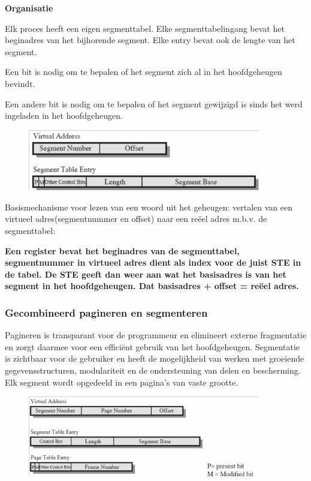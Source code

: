 \textbf{Organisatie}

Elk proces heeft een eigen segmenttabel. Elke segmenttabelingang bevat het beginadres van het bijhorende segment. Elke entry bevat ook de lengte van het segment.

Een bit is nodig om te bepalen of het segment zich al in het hoofdgeheugen bevindt.

Een andere bit is nodig om te bepalen of het segment gewijzigd is sinds het werd ingeladen in het hoofdgeheugen.


\begin{figure}[htp]
    \centering
            \includegraphics[width=4in]{img/organisatie}
        \caption{}
    \label{fig:}
\end{figure}

Basismechanisme voor lezen van een woord uit het geheugen: vertalen van een virtueel adres(segmentnummer en offset) naar een reëel adres m.b.v. de segmenttabel:

\textbf{Een register bevat het beginadres van de segmenttabel, segmentnummer in virtueel adres dient als index voor de juist STE in de tabel. De STE geeft dan weer aan wat het basisadres is van het segment in het hoofdgeheugen. Dat basisadres + offset = reëel adres.}


\subsubsection{Gecombineerd pagineren en segmenteren}

Pagineren is transparant voor de programmeur en elimineert externe fragmentatie en zorgt daarmee voor een efficiënt gebruik van het hoofdgeheugen. Segmentatie is zichtbaar voor de gebruiker en heeft de mogelijkheid van werken met groeiende gegevensstructuren, modulariteit en de ondersteuning van delen en bescherming. Elk segment wordt opgedeeld in een pagina’s van vaste grootte.

\begin{figure}[htp]
    \centering
            \includegraphics[width=4in]{img/entries}
        \caption{}
    \label{fig:}
\end{figure}

